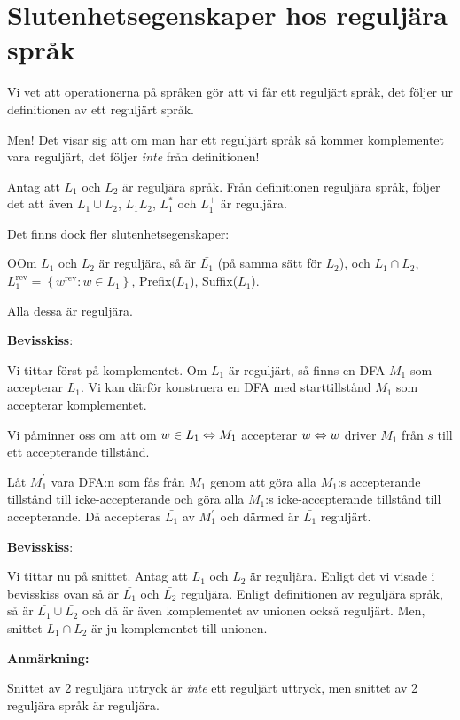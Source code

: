 \section{Slutenhetsegenskaper hos reguljära språk}\par
\noindent Vi vet att operationerna på språken gör att vi får ett reguljärt språk, det följer ur definitionen av ett reguljärt språk.\par
\noindent Men! Det visar sig att om man har ett reguljärt språk så kommer komplementet vara reguljärt, det följer \textit{inte} från definitionen!
\par\bigskip
\noindent Antag att $L_1$ och $L_2$ är reguljära språk. Från definitionen reguljära språk, följer det att även $L_1\cup L_2$, $L_1L_2$, $L_1^*$ och $L_1^+$ är reguljära.\par
\noindent Det finns dock fler slutenhetsegenskaper:
\par\bigskip
\begin{theo}
  OOm $L_1$ och $L_2$ är reguljära, så är $\bar{L_1}$ (på samma sätt för $L_2$), och $L_1\cap L_2$, $L_1^{\text{rev}} = \left\{w^{\text{rev}}: w\in L_1\right\}$, Prefix($L_1$), Suffix($L_1$).\par
  \noindent Alla dessa är reguljära.
\end{theo}
\par\bigskip
\noindent\textbf{Bevisskiss}:\par
\noindent Vi tittar först på komplementet. Om $L_1$ är reguljärt, så finns en DFA $M_1$ som accepterar $L_1$. Vi kan därför konstruera en DFA med starttillstånd $M_1$ som accepterar komplementet.\par
\noindent Vi påminner oss om att om $w\in L_1\Leftrightarrow M_1$ accepterar $w\Leftrightarrow w$ driver $M_1$ från $s$ till ett accepterande tillstånd.\par
\noindent Låt $M_1^{\prime}$ vara DFA:n som fås från $M_1$ genom att göra alla $M_1$:s accepterande tillstånd till icke-accepterande och göra alla $M_1$:s icke-accepterande tillstånd till accepterande. Då accepteras $\bar{L_1}$ av $M_1^{\prime}$ och därmed är $\bar{L_1}$ reguljärt.
\par\bigskip
\noindent\textbf{Bevisskiss}:\par
\noindent Vi tittar nu på snittet. Antag att $L_1$ och $L_2$ är reguljära. Enligt det vi visade i bevisskiss ovan så är $\bar{L_1}$ och $\bar{L_2}$ reguljära. Enligt definitionen av reguljära språk, så är $\bar{L_1}\cup\bar{L_2}$ och då är även komplementet av unionen också reguljärt. Men, snittet $L_1\cap L_2$ är ju komplementet till unionen.
\par\bigskip
\noindent\textbf{Anmärkning:}\par
\noindent Snittet av 2 reguljära uttryck är \textit{inte} ett reguljärt uttryck, men snittet av 2 reguljära språk är reguljära.
\newpage
